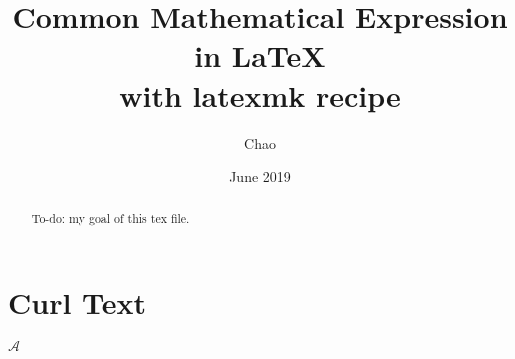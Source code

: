 \documentclass{article}
\title{Common Mathematical Expression \\
\large in \LaTeX \\
with latexmk recipe}
\author{Chao}
\date{June 2019}
\begin{document}
\maketitle
\begin{abstract}
    To-do: my goal of this tex file.
\end{abstract}
\section{Curl Text}
$\mathcal{A}$
\end{document}
